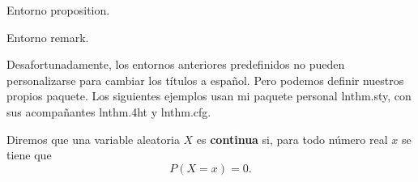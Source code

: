 \documentclass{ximera}
\begin{document}
%
%
%
%
%
%
%
%
%

\begin{proposition}
  Entorno {\ttfamily proposition}.
\end{proposition}

\begin{remark}
  Entorno {\ttfamily remark}.
\end{remark}

%
%

Desafortunadamente, los entornos anteriores predefinidos no pueden personalizarse para cambiar los títulos a español. 
Pero podemos definir nuestros propios paquete. Los siguientes ejemplos usan mi paquete personal {\ttfamily lnthm.sty}, con sus acompañantes {\ttfamily lnthm.4ht} y {\ttfamily lnthm.cfg}. 

\lipsum[1]
%
\begin{dfn}
	Diremos que una variable aleatoria $X$ es {\bfseries continua} si, para todo número real $x$ se tiene que 
	\[
		P(X=x)=0.
	\]
\end{dfn}
\end{document}
